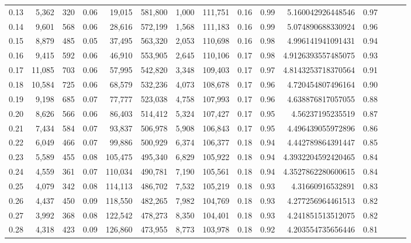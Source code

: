 \begin{tabular}{rrrrrrrrrrrrrrr}
0.13 &   5,362 &    320 &  0.06 &   19,015 &  581,800 &    1,000 &  111,751 &  0.16 &  0.99 &       5.160042926448546 &      0.97 \\
0.14 &   9,601 &    568 &  0.06 &   28,616 &  572,199 &    1,568 &  111,183 &  0.16 &  0.99 &       5.074890688330924 &      0.96 \\
0.15 &   8,879 &    485 &  0.05 &   37,495 &  563,320 &    2,053 &  110,698 &  0.16 &  0.98 &       4.996141941091431 &      0.94 \\
0.16 &   9,415 &    592 &  0.06 &   46,910 &  553,905 &    2,645 &  110,106 &  0.17 &  0.98 &      4.9126393557485075 &      0.93 \\
0.17 &  11,085 &    703 &  0.06 &   57,995 &  542,820 &    3,348 &  109,403 &  0.17 &  0.97 &      4.8143253718370564 &      0.91 \\
0.18 &  10,584 &    725 &  0.06 &   68,579 &  532,236 &    4,073 &  108,678 &  0.17 &  0.96 &       4.720454807496164 &      0.90 \\
0.19 &   9,198 &    685 &  0.07 &   77,777 &  523,038 &    4,758 &  107,993 &  0.17 &  0.96 &       4.638876817057055 &      0.88 \\
0.20 &   8,626 &    566 &  0.06 &   86,403 &  514,412 &    5,324 &  107,427 &  0.17 &  0.95 &        4.56237195235519 &      0.87 \\
0.21 &   7,434 &    584 &  0.07 &   93,837 &  506,978 &    5,908 &  106,843 &  0.17 &  0.95 &       4.496439055972896 &      0.86 \\
0.22 &   6,049 &    466 &  0.07 &   99,886 &  500,929 &    6,374 &  106,377 &  0.18 &  0.94 &       4.442789864391447 &      0.85 \\
0.23 &   5,589 &    455 &  0.08 &  105,475 &  495,340 &    6,829 &  105,922 &  0.18 &  0.94 &      4.3932204592420465 &      0.84 \\
0.24 &   4,559 &    361 &  0.07 &  110,034 &  490,781 &    7,190 &  105,561 &  0.18 &  0.94 &      4.3527862280600615 &      0.84 \\
0.25 &   4,079 &    342 &  0.08 &  114,113 &  486,702 &    7,532 &  105,219 &  0.18 &  0.93 &        4.31660916532891 &      0.83 \\
0.26 &   4,437 &    450 &  0.09 &  118,550 &  482,265 &    7,982 &  104,769 &  0.18 &  0.93 &       4.277256964461513 &      0.82 \\
0.27 &   3,992 &    368 &  0.08 &  122,542 &  478,273 &    8,350 &  104,401 &  0.18 &  0.93 &       4.241851513512075 &      0.82 \\
0.28 &   4,318 &    423 &  0.09 &  126,860 &  473,955 &    8,773 &  103,978 &  0.18 &  0.92 &       4.203554735656446 &      0.81 \\

\end{tabular}
